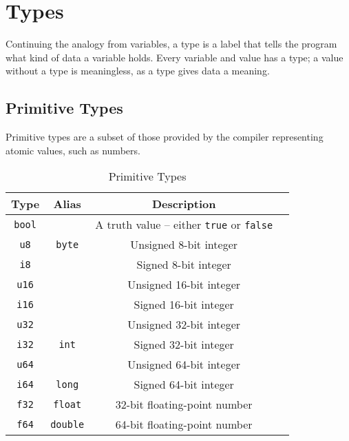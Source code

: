 \section{Types}\label{sec:types}

Continuing the analogy from variables, a type is a label that tells the program what kind of data a variable holds.
Every variable and value has a type; a value without a type is meaningless, as a type gives data a meaning.

\subsection{Primitive Types}

Primitive types are a subset of those provided by the compiler representing atomic values, such as numbers.

\medskip
\begin{table}[H]
    \centering
    \begin{tabular}{|c|c|c|l|}
        \hline
        \textbf{Type} & \textbf{Alias} & \textbf{Description} \\
        \hline
        \texttt{bool} & & A truth value -- either \texttt{true} or \texttt{false} \\
        \hline
        \texttt{u8} & \texttt{byte} & Unsigned 8-bit integer \\
        \texttt{i8} & & Signed 8-bit integer \\
        \hline
        \texttt{u16} & & Unsigned 16-bit integer \\
        \texttt{i16} & & Signed 16-bit integer \\
        \hline
        \texttt{u32} & & Unsigned 32-bit integer \\
        \texttt{i32} & \texttt{int} & Signed 32-bit integer \\
        \hline
        \texttt{u64} & & Unsigned 64-bit integer \\
        \texttt{i64} & \texttt{long} & Signed 64-bit integer \\
        \hline
        \texttt{f32} & \texttt{float} & 32-bit floating-point number \\
        \texttt{f64} & \texttt{double} & 64-bit floating-point number \\
        \hline
    \end{tabular}
    \caption{Primitive Types}\label{tab:primitive-types}
\end{table}


